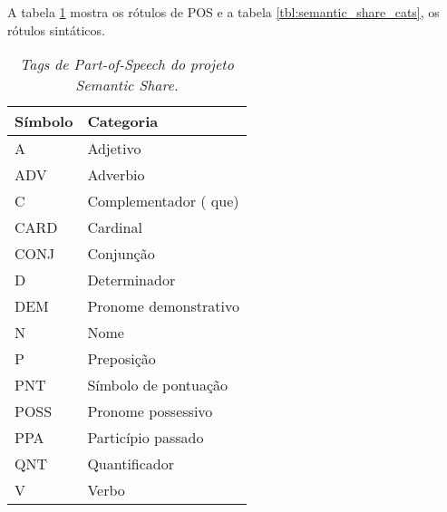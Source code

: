 A tabela \ref{tbl:semantic_share_pos} mostra os rótulos de POS e a tabela \ref{tbl:semantic_share_cats}, os rótulos sintáticos.

\begin{table}
   \centering
   \small
   \caption{\it Tags de Part-of-Speech do projeto Semantic Share.}

    \begin{tabular}{ | p{3cm} | p{10cm} | }
      \hline
        \textbf{Símbolo} & \textbf{Categoria}\\
        \hline
        \hline

    A&Adjetivo\\
    \hline
    ADV&Adverbio\\
    \hline
    C&Complementador ( que)\\
    \hline
    CARD&Cardinal\\
    \hline
    CONJ&Conjunção\\
    \hline
    D&Determinador\\
    \hline
    DEM&Pronome demonstrativo\\
    \hline
    N&Nome\\
    \hline
    P&Preposição\\
    \hline
    PNT&Símbolo de pontuação\\
    \hline
    POSS&Pronome possessivo\\
    \hline
    PPA&Particípio passado\\
    \hline
    QNT& Quantificador\\
    \hline
    V& Verbo\\
    \hline


   \end{tabular}
   \label{tbl:semantic_share_pos}
\end{table}


